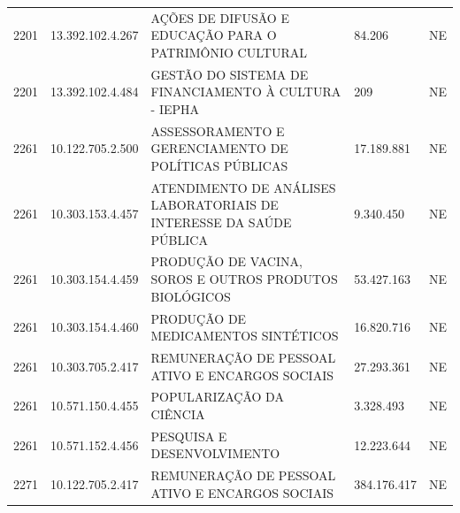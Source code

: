 \documentclass{article}
\begin{document}
\begin{longtable}[c]{m{1cm}|m{2cm}|m{10cm}|m{2cm}|m{1cm}}
\multicolumn{1}{C{1cm}|}{2201} & \multicolumn{1}{C{2cm}|}{13.392.102.4.267} & \multicolumn{1}{L{10cm}|}{AÇÕES DE DIFUSÃO E EDUCAÇÃO PARA O PATRIMÔNIO CULTURAL} & \multicolumn{1}{R{2cm}|}{84.206} & \multicolumn{1}{C{1cm}}{NE} \\
\multicolumn{1}{C{1cm}|}{2201} & \multicolumn{1}{C{2cm}|}{13.392.102.4.484} & \multicolumn{1}{L{10cm}|}{GESTÃO DO SISTEMA DE FINANCIAMENTO À CULTURA - IEPHA} & \multicolumn{1}{R{2cm}|}{209} & \multicolumn{1}{C{1cm}}{NE} \\
\multicolumn{1}{C{1cm}|}{2261} & \multicolumn{1}{C{2cm}|}{10.122.705.2.500} & \multicolumn{1}{L{10cm}|}{ASSESSORAMENTO E GERENCIAMENTO DE POLÍTICAS PÚBLICAS} & \multicolumn{1}{R{2cm}|}{17.189.881} & \multicolumn{1}{C{1cm}}{NE} \\
\multicolumn{1}{C{1cm}|}{2261} & \multicolumn{1}{C{2cm}|}{10.303.153.4.457} & \multicolumn{1}{L{10cm}|}{ATENDIMENTO DE ANÁLISES LABORATORIAIS DE INTERESSE DA SAÚDE PÚBLICA} & \multicolumn{1}{R{2cm}|}{9.340.450} & \multicolumn{1}{C{1cm}}{NE} \\
\multicolumn{1}{C{1cm}|}{2261} & \multicolumn{1}{C{2cm}|}{10.303.154.4.459} & \multicolumn{1}{L{10cm}|}{PRODUÇÃO DE VACINA, SOROS E OUTROS PRODUTOS BIOLÓGICOS} & \multicolumn{1}{R{2cm}|}{53.427.163} & \multicolumn{1}{C{1cm}}{NE} \\
\multicolumn{1}{C{1cm}|}{2261} & \multicolumn{1}{C{2cm}|}{10.303.154.4.460} & \multicolumn{1}{L{10cm}|}{PRODUÇÃO DE MEDICAMENTOS SINTÉTICOS} & \multicolumn{1}{R{2cm}|}{16.820.716} & \multicolumn{1}{C{1cm}}{NE} \\
\multicolumn{1}{C{1cm}|}{2261} & \multicolumn{1}{C{2cm}|}{10.303.705.2.417} & \multicolumn{1}{L{10cm}|}{REMUNERAÇÃO DE PESSOAL ATIVO E ENCARGOS SOCIAIS} & \multicolumn{1}{R{2cm}|}{27.293.361} & \multicolumn{1}{C{1cm}}{NE} \\
\multicolumn{1}{C{1cm}|}{2261} & \multicolumn{1}{C{2cm}|}{10.571.150.4.455} & \multicolumn{1}{L{10cm}|}{POPULARIZAÇÃO DA CIÊNCIA} & \multicolumn{1}{R{2cm}|}{3.328.493} & \multicolumn{1}{C{1cm}}{NE} \\
\multicolumn{1}{C{1cm}|}{2261} & \multicolumn{1}{C{2cm}|}{10.571.152.4.456} & \multicolumn{1}{L{10cm}|}{PESQUISA E DESENVOLVIMENTO} & \multicolumn{1}{R{2cm}|}{12.223.644} & \multicolumn{1}{C{1cm}}{NE} \\
\multicolumn{1}{C{1cm}|}{2271} & \multicolumn{1}{C{2cm}|}{10.122.705.2.417} & \multicolumn{1}{L{10cm}|}{REMUNERAÇÃO DE PESSOAL ATIVO E ENCARGOS SOCIAIS} & \multicolumn{1}{R{2cm}|}{384.176.417} & \multicolumn{1}{C{1cm}}{NE} \\

\end{longtable}
\end{document}
